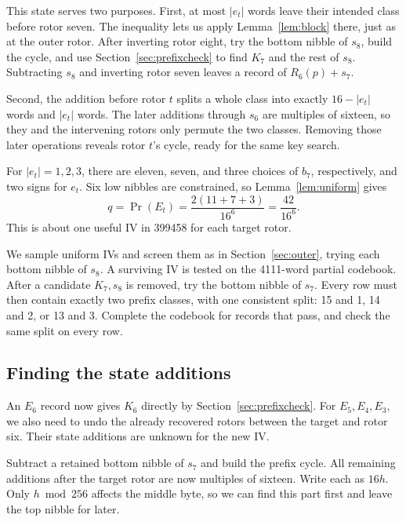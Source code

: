 \documentclass[11pt]{article}
\begin{document}
This state serves two purposes. First, at most \(|e_t|\) words leave
their intended class before rotor seven. The inequality lets us apply
Lemma~\ref{lem:block} there, just as at the outer rotor. After inverting
rotor eight, try the bottom nibble of \(s_8\), build the cycle, and use
Section~\ref{sec:prefixcheck} to find \(K_7\) and the rest of \(s_8\).
Subtracting \(s_8\) and inverting rotor seven leaves a record of
\(R_6(p)+s_7\).

Second, the addition before rotor \(t\) splits a whole class into exactly
\(16-|e_t|\) words and \(|e_t|\) words. The later additions through
\(s_6\) are multiples of sixteen, so they and the intervening rotors
only permute the two classes. Removing those later operations reveals
rotor \(t\)'s cycle, ready for the same key search.

For \(|e_t|=1,2,3\), there are eleven, seven, and three choices of
\(b_7\), respectively, and two signs for \(e_t\). Six low nibbles are
constrained, so Lemma~\ref{lem:uniform} gives
\begin{equation}
 q=\Pr(E_t)=\frac{2(11+7+3)}{16^6}=\frac{42}{16^6}.
 \label{eq:q}
\end{equation}
This is about one useful IV in 399458 for each target rotor.

We sample uniform IVs and screen them as in Section~\ref{sec:outer}, trying each bottom nibble of \(s_8\).
A surviving IV is tested on the 4111-word partial codebook. After a
candidate \(K_7,s_8\) is removed, try the bottom nibble of \(s_7\).
Every row must then contain exactly two prefix classes, with one
consistent split: 15 and 1, 14 and 2, or 13 and 3. Complete the codebook
for records that pass, and check the same split on every row.

\subsection{Finding the state additions}\label{sec:offsets}
An \(E_6\) record now gives \(K_6\) directly by
Section~\ref{sec:prefixcheck}. For \(E_5,E_4,E_3\), we also need to undo
the already recovered rotors between the target and rotor six.
Their state additions are unknown for the new IV.

Subtract a retained bottom nibble of \(s_7\) and build the prefix cycle.
All remaining additions after the target rotor are now multiples of
sixteen. Write each as \(16h\). Only \(h\bmod256\) affects the middle
byte, so we can find this part first and leave the top nibble for later.
\end{document}
